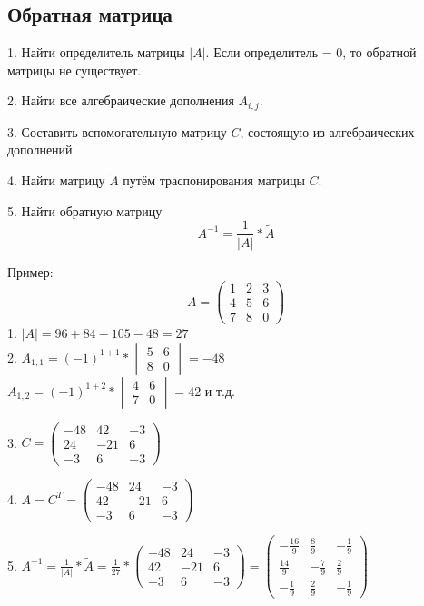 \documentclass[12pt,a4paper]{article}
\begin{document}
\subsection{Обратная матрица}
1. Найти определитель матрицы $|A|$. Если определитель = 0, то обратной матрицы не существует.

2. Найти все алгебраические дополнения $A_{i,j}$. 

3. Составить вспомогательную матрицу $C$, состоящую из алгебраических дополнений. 

4. Найти матрицу $\tilde{A}$ путём траспонирования матрицы $C$. 

5. Найти обратную матрицу $$A^{-1}=\frac{1}{|A|}*\tilde{A}$$

Пример:
$$A=\begin{pmatrix}
1& 2& 3 \\
4& 5& 6 \\
7& 8& 0
\end{pmatrix}$$
1. $|A|=96+84-105-48=27$ \\
2. $A_{1,1}=(-1)^{1+1}*\begin{vmatrix}
5& 6 \\
8& 0
\end{vmatrix}=-48$\\
$A_{1,2}=(-1)^{1+2}*\begin{vmatrix}
4& 6 \\
7& 0
\end{vmatrix}=42$ и т.д. 

3. $C=\begin{pmatrix}
-48& 42& -3 \\
24& -21& 6 \\
-3& 6& -3
\end{pmatrix}$ 

4. $\tilde{A}=C^{T}=\begin{pmatrix}
-48& 24& -3 \\
42& -21& 6 \\
-3& 6& -3
\end{pmatrix}$ 

5. $A^{-1}=\frac{1}{|A|}*\tilde{A}=\frac{1}{27}*\begin{pmatrix}
-48& 24& -3 \\
42& -21& 6 \\
-3& 6& -3
\end{pmatrix}=\begin{pmatrix}
-\frac{16}{9}& \frac{8}{9}& -\frac{1}{9} \\
\frac{14}{9}& -\frac{7}{9}& \frac{2}{9} \\
-\frac{1}{9}& \frac{2}{9}& -\frac{1}{9}
\end{pmatrix}$
\end{document}
